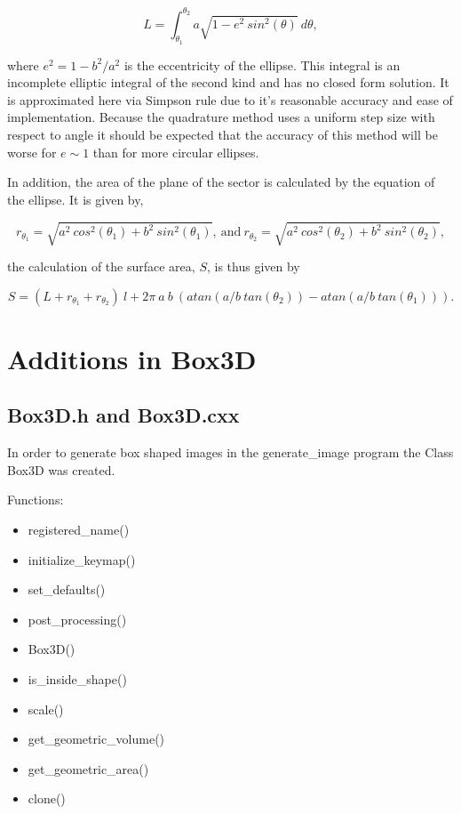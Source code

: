 \documentclass[10pt]{article}
\begin{document}
\begin{equation}
L = \int_{\theta_1}^{\theta_2}{a \sqrt{1-e^2 ~sin^2(\theta)}~d\theta},
\end{equation}

\noindent where $e^2 = 1 - b^2/a^2$ is the eccentricity of the ellipse.  This integral is an incomplete elliptic integral of the second kind and has no closed form solution.  It is approximated here via Simpson rule due to it's reasonable accuracy and ease of implementation.  Because the quadrature method uses a uniform step size with respect to angle it should be expected that the accuracy of this method will be worse for $e \sim 1$ than for more circular ellipses.  

In addition, the area of the plane of the sector is calculated by the equation of the ellipse.  It is given by,

\begin{equation}
r_{\theta_1} = \sqrt{a^2 ~cos^2(\theta_1)+ b^2~sin^2(\theta_1)}, ~\mbox{and}~ r_{\theta_2} = \sqrt{a^2 ~cos^2(\theta_2)+ b^2~sin^2(\theta_2)},
\end{equation}

\noindent the calculation of the surface area, $S$, is thus given by

\begin{equation}
S = (L + r_{\theta_1} + r_{\theta_2}) ~l + 2 \pi ~a ~b ~(atan(a/b ~tan(\theta_2)) - atan(a/b ~tan(\theta_1))).
\end{equation}

\section{Additions in Box3D}

\subsection{Box3D.h and Box3D.cxx}

In order to generate box shaped images in the generate\_image program the Class Box3D was created. 

Functions: 
\begin{itemize}
\item registered\_name()
\item initialize\_keymap()
\item set\_defaults()
\item post\_processing()
\item Box3D()
\item is\_inside\_shape()
\item scale()
\item get\_geometric\_volume()
\item get\_geometric\_area()
\item clone()
\end{itemize}
\end{document}
